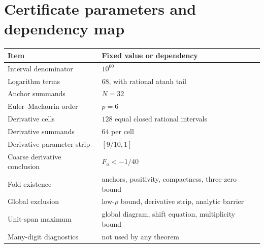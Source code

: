 \documentclass[11pt]{article}
\numberwithin{equation}{section}
\theoremstyle{definition}
\begin{document}
\section{Certificate parameters and dependency map}
\begin{center}
\begin{tabular}{ll}
\toprule
Item & Fixed value or dependency\\
\midrule
Interval denominator & $10^{60}$\\
Logarithm terms & $68$, with rational atanh tail\\
Anchor summands & $N=32$\\
Euler--Maclaurin order & $p=6$\\
Derivative cells & $128$ equal closed rational intervals\\
Derivative summands & $64$ per cell\\
Derivative parameter strip & $[9/10,1]$\\
Coarse derivative conclusion & $F_a<-1/40$\\
Fold existence & anchors, positivity, compactness, three-zero bound\\
Global exclusion & low-$\rho$ bound, derivative strip, analytic barrier\\
Unit-span maximum & global diagram, shift equation, multiplicity bound\\
Many-digit diagnostics & not used by any theorem\\
\bottomrule
\end{tabular}
\end{center}
\end{document}
